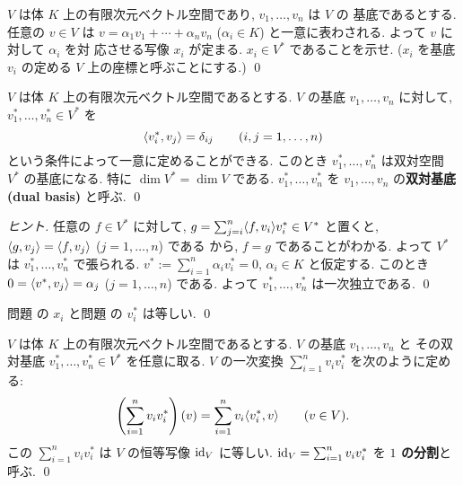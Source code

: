 \documentclass[12pt,twoside]{jarticle}
\begin{document}

\begin{question}[基底の定める座標, 5点]
  \label{q:x_i}
  $V$ は体 $K$ 上の有限次元ベクトル空間であり, $v_1,\ldots,v_n$ は $V$ の
  基底であるとする. 任意の $v\in V$ は $v=\alpha_1v_1+\cdots+\alpha_nv_n$ 
  ($\alpha_i\in K$) と一意に表わされる.  よって $v$ に対して $\alpha_i$ を対
  応させる写像 $x_i$ が定まる.  $x_i\in V^*$ であることを示せ. 
  ($x_i$ を基底 $v_i$ の定める $V$ 上の座標と呼ぶことにする.)
  \qed
\end{question}


\begin{question}[双対基底, 10点]
  \label{q:dual-basis}
  $V$ は体 $K$ 上の有限次元ベクトル空間であるとする.
  $V$ の基底 $v_1,\ldots,v_n$ に対して,
  $v^*_1,\ldots,v^*_n\in V^*$ を
  \begin{equation*}
    \langle v^*_i, v_j \rangle = \delta_{ij}
    \qquad (i,j=1,\ldots,n)
  \end{equation*}
  という条件によって一意に定めることができる.
  このとき $v^*_1,\ldots,v^*_n$ は双対空間 $V^*$ の基底になる.
  特に $\dim V^* = \dim V$ である.
  $v^*_1,\ldots,v^*_n$ を $v_1,\ldots,v_n$ の{\bf 双対基底 (dual basis)} 
  と呼ぶ.
  \qed
\end{question}

\begin{proof}[ヒント]
  任意の $f\in V^*$ に対して, $g=\sum_{j=i}^n\langle f,v_i\rangle v^*_i\in V^*$ 
  と置くと, $\langle g,v_j\rangle = \langle f,v_j\rangle$ ($j=1,\ldots,n$) である
  から, $f=g$ であることがわかる.  
  よって $V^*$ は $v^*_1,\dots,v^*_n$ で張られる.
  $v^*:=\sum_{i=1}^n\alpha_i v^*_i=0$, $\alpha_i\in K$ 
  と仮定する. このとき $0=\langle v^*,v_j\rangle=\alpha_j$ ($j=1,\ldots,n$) である.
  よって $v^*_1,\dots,v^*_n$ は一次独立である.
  \qed
\end{proof}

\begin{rem}
  問題  の $x_i$ と問題  の $v^*_i$ は等しい.
  \qed
\end{rem}


\begin{question}[1の分解, 10点]
  \label{q:1=sum-vv*}
  $V$ は体 $K$ 上の有限次元ベクトル空間であるとする.
  $V$ の基底 $v_1,\ldots,v_n$ と
  その双対基底 $v^*_1,\ldots,v^*_n\in V^*$ を任意に取る.
  $V$ の一次変換 $\sum_{i=1}^n v_iv_i^*$ を次のように定める:
  \begin{equation*}
    \left(\sum_{i=1}^n v_iv_i^*\right)(v)
    = \sum_{i=1}^n v_i \langle v_i^*, v\rangle
    \qquad (v\in V).
  \end{equation*}
  この $\sum_{i=1}^n v_iv_i^*$ は $V$ の恒等写像 $\mathop{\mathrm{id}}\nolimits_V$ に等しい.
  $\mathop{\mathrm{id}}\nolimits_V = \sum_{i=1}^n v_iv_i^*$ を {\bf $1$ の分割}と呼ぶ.
  \qed
\end{question}
\end{document}
